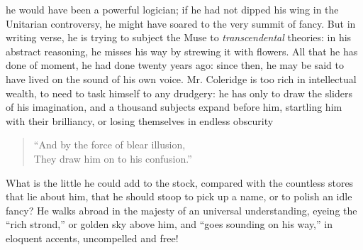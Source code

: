 he would have been a powerful logician; if he had not dipped his
wing in the Unitarian controversy, he might have soared to the
very summit of fancy. But in writing verse, he is trying to
subject the Muse to \emph{transcendental} theories: in his abstract
reasoning, he misses his way by strewing it with flowers. All that
he has done of moment, he had done twenty years ago: since then,
he may be said to have lived on the sound of his own
voice. Mr. Coleridge is too rich in intellectual wealth, to need
to task himself to any drudgery: he has only to draw the sliders
of his imagination, and a thousand subjects expand before him,
startling him with their brilliancy, or losing themselves in
endless obscurity\textemdash 
\begin{quote}
  ``And by the force of blear illusion, \\
  They draw him on to his confusion.''
\end{quote}
What is the little he could add to the stock, compared with the
countless stores that lie about him, that he should stoop to pick
up a name, or to polish an idle fancy? He walks abroad in the
majesty of an universal understanding, eyeing the ``rich strond,''
or golden sky above him, and ``goes sounding on his way,'' in
eloquent accents, uncompelled and free!

